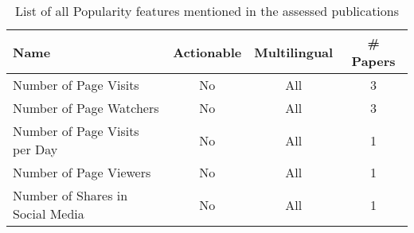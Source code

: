 \begin{table}[htbp]
    \caption{List of all Popularity features mentioned in the assessed publications}
    \label{tab:feat_Popularity}
    \centering
    \begin{tabular}{m{} c c c}
        \toprule
        \textbf{Name} & \textbf{Actionable} & \textbf{Multilingual} & \textbf{\# Papers} \\ 
        \midrule
        Number of Page Visits & No & All & 3 \\
        Number of Page Watchers & No & All & 3 \\
        Number of Page Visits per Day & No & All & 1 \\
        Number of Page Viewers & No & All & 1 \\
        Number of Shares in Social Media & No & All & 1 \\
        \bottomrule
    \end{tabular}
\end{table}